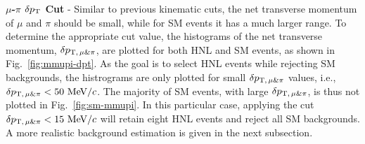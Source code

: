         \textbf{$\mu$-$\pi$ $\delta p_\textrm{T}$ Cut} - Similar to previous kinematic cuts, the net transverse momentum of $\mu$ and $\pi$ should be small, while for SM events it has a much larger range.
        To determine the appropriate cut value, the histograms of the net transverse momentum, $\delta p_{\textrm{T},\,\mu\&\pi}$, are plotted for both HNL and SM events, as shown in Fig.~\ref{fig:mmupi-dpt}.
        As the goal is to select HNL events while rejecting SM backgrounds, the histrograms are only plotted for small $\delta p_{\textrm{T},\,\mu\&\pi}$ values, i.e., $\delta p_{\textrm{T},\,\mu\&\pi}<50~\textrm{MeV}/c$. 
        The majority of SM events, with large $\delta p_{\textrm{T},\,\mu\&\pi}$, is thus not plotted in Fig.~\ref{fig:sm-mmupi}.
        In this particular case, applying the cut $\delta p_{\textrm{T},\,\mu\&\pi}<15~\textrm{MeV}/c$ will retain eight HNL events and reject all SM backgrounds.
        A more realistic background estimation is given in the next subsection.

